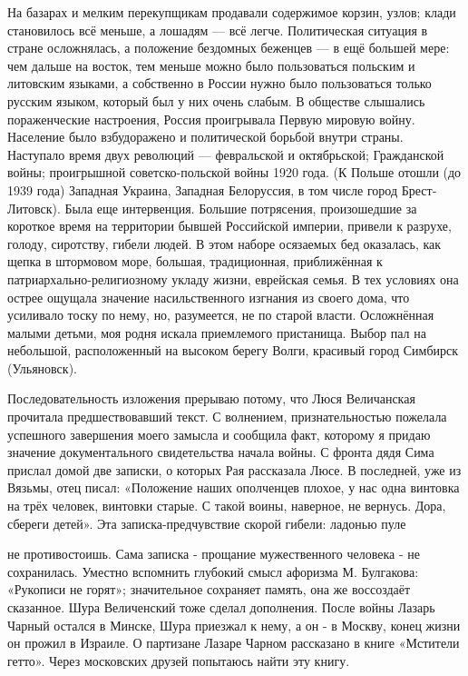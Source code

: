 \label{069-1}
На базарах и мелким перекупщикам продавали содержимое корзин, узлов; клади становилось всё меньше, а лошадям — всё легче. Политическая ситуация в стране осложнялась, а положение бездомных беженцев — в ещё большей мере: чем дальше на восток, тем меньше можно было пользоваться польским и литовским языками, а собственно в России нужно было пользоваться только русским языком, который был у них очень слабым. В обществе слышались пораженческие настроения, Россия проигрывала Первую мировую войну. Население было взбудоражено и политической борьбой внутри страны. Наступало время двух революций — февральской и октябрьской; Гражданской войны; проигрышной советско-польской войны 1920 года. (К Польше отошли (до 1939 года) Западная Украина, Западная Белоруссия, в том числе город 
Брест-Литовск). Была еще интервенция. Большие потрясения, произошедшие за короткое время на территории бывшей Российской империи, привели к разрухе, голоду, сиротству, гибели людей. В этом наборе осязаемых бед оказалась, как щепка в штормовом море, большая, традиционная, приближённая к патриархально-религиозному укладу жизни, еврейская семья. В тех условиях она острее ощущала значение насильственного изгнания из своего дома, что усиливало тоску по нему, но, разумеется, не по старой власти. Осложнённая малыми детьми, моя родня искала приемлемого пристанища. Выбор пал на небольшой, расположенный на высоком берегу Волги, красивый город Симбирск (Ульяновск).

\label{070-1}
Последовательность изложения прерываю потому, что Люся Величанская прочитала предшествовавший текст. С волнением, признательностью пожелала успешного завершения моего замысла и сообщила факт, которому я придаю значение документального свидетельства начала войны. С фронта дядя Сима прислал домой две записки, о которых Рая рассказала Люсе. В последней, уже из Вязьмы, отец писал: «Положение наших ополченцев плохое, у нас одна винтовка на трёх человек, винтовки старые. С такой воины, наверное, не вернусь. Дора, сбереги детей». Эта записка-предчувствие скорой гибели: ладонью пуле

\label{071-1}
не противостоишь. Сама записка - прощание мужественного человека - не сохранилась. Уместно вспомнить глубокий смысл афоризма М. Булгакова: «Рукописи не горят»; значительное сохраняет память, она же воссоздаёт сказанное. Шура Величенский тоже сделал дополнения. После войны Лазарь 
Чарный остался в Минске, Шура приезжал к нему, а он - в Москву, конец жизни он 
прожил в Израиле. О партизане Лазаре Чарном рассказано в книге «Мстители гетто». Через московских друзей попытаюсь найти эту книгу.